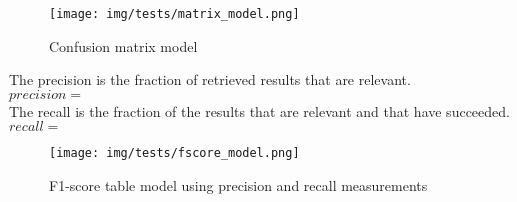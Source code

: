 		\begin{figure}[h]
				\begin{center}
			    \texttt{[image: img/tests/matrix\_model.png]}
				\caption[Confusion matrix model]{Confusion matrix model}
				\end{center}
		\end{figure}


		The precision is the fraction of retrieved results that are relevant.  
		\\

		$precision=$
		\\

		The recall is the fraction of the results that are relevant and that have succeeded. 
		\\

		$recall=$
		\\


		\begin{figure}[h]
				\begin{center}
			    \texttt{[image: img/tests/fscore\_model.png]}
				\caption[F1-score table model]{F1-score table model using precision and recall measurements}
				\end{center}
		\end{figure}




